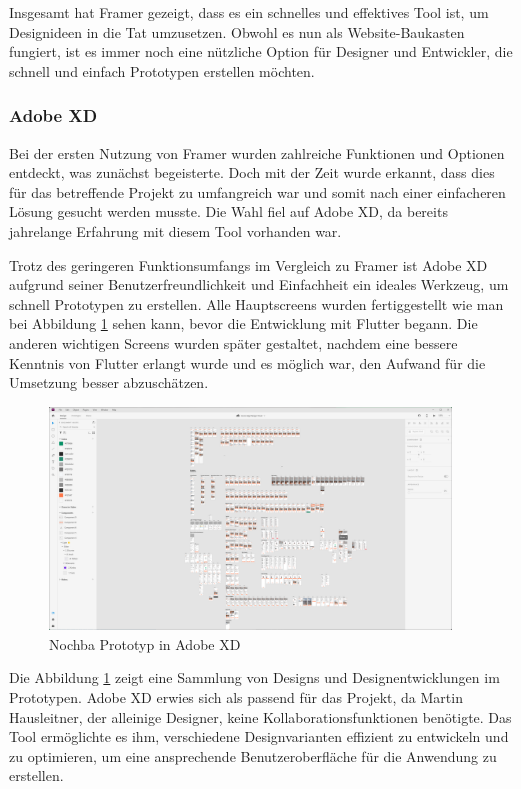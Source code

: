 Insgesamt hat Framer gezeigt, dass es ein schnelles und effektives Tool ist, um Designideen in die Tat umzusetzen. Obwohl es nun als Website-Baukasten fungiert, ist es immer noch eine nützliche Option für Designer und Entwickler, die schnell und einfach Prototypen erstellen möchten.

\subsubsection{Adobe XD}
Bei der ersten Nutzung von Framer wurden zahlreiche Funktionen und Optionen entdeckt, was zunächst begeisterte. Doch mit der Zeit wurde erkannt, dass dies für das betreffende Projekt zu umfangreich war und somit nach einer einfacheren Lösung gesucht werden musste. Die Wahl fiel auf Adobe XD, da bereits jahrelange Erfahrung mit diesem Tool vorhanden war.

Trotz des geringeren Funktionsumfangs im Vergleich zu Framer
ist Adobe XD aufgrund seiner Benutzerfreundlichkeit und
Einfachheit ein ideales Werkzeug, um schnell Prototypen zu
erstellen. Alle Hauptscreens wurden fertiggestellt wie man
bei Abbildung \ref{fig:adobexd-prototyp} sehen kann, bevor
die Entwicklung mit Flutter begann. Die anderen wichtigen
Screens wurden später gestaltet, nachdem eine bessere
Kenntnis von Flutter erlangt wurde und es möglich war, den
Aufwand für die Umsetzung besser abzuschätzen.

\begin{figure}[h]
  \centering
  \includegraphics[width=0.95\textwidth]{pics/nochba-adobe-xd-protoype-screenshot.png}
  \caption{Nochba Prototyp in Adobe XD}
  \label{fig:adobexd-prototyp}
\end{figure}

Die Abbildung \ref{fig:adobexd-prototyp} zeigt eine Sammlung von Designs und Designentwicklungen im Prototypen. Adobe XD erwies sich als passend für das Projekt, da Martin Hausleitner, der alleinige Designer, keine Kollaborationsfunktionen benötigte. Das Tool ermöglichte es ihm, verschiedene Designvarianten effizient zu entwickeln und zu optimieren, um eine ansprechende Benutzeroberfläche für die Anwendung zu erstellen.

